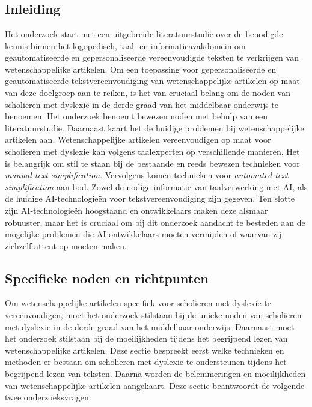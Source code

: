 \chapter{}%
\label{ch:stand-van-zaken}

\section{Inleiding}

Het onderzoek start met een uitgebreide literatuurstudie over de benodigde kennis binnen het logopedisch, taal- en informaticavakdomein om geautomatiseerde en gepersonaliseerde vereenvoudigde teksten te verkrijgen van wetenschappelijke artikelen. Om een toepassing voor gepersonaliseerde en geautomatiseerde tekstvereenvoudiging van wetenschappelijke artikelen  op maat van deze doelgroep aan te reiken, is het van cruciaal belang om de noden van scholieren met dyslexie in de derde graad van het middelbaar onderwijs te benoemen. Het onderzoek benoemt bewezen noden met behulp van een literatuurstudie. Daarnaast kaart het de huidige problemen bij wetenschappelijke artikelen aan. Wetenschappelijke artikelen vereenvoudigen op maat voor scholieren met dyslexie kan volgens taalexperten op verschillende manieren. Het is belangrijk om stil te staan bij de bestaande en reeds bewezen technieken voor \textit{manual text simplification}. Vervolgens komen technieken voor \textit{automated text simplification} aan bod. Zowel de nodige informatie van taalverwerking met AI, als de huidige AI-technologieën voor tekstvereenvoudiging zijn gegeven. Ten slotte zijn AI-technologieën hoogstaand en ontwikkelaars maken deze alsmaar robuuster, maar het is cruciaal om bij dit onderzoek aandacht te besteden aan de mogelijke problemen die AI-ontwikkelaars moeten vermijden of waarvan zij zichzelf attent op moeten maken. 

\section{Specifieke noden en richtpunten}

Om wetenschappelijke artikelen specifiek voor scholieren met dyslexie te vereenvoudigen, moet het onderzoek stilstaan bij de unieke noden van scholieren met dyslexie in de derde graad van het middelbaar onderwijs. Daarnaast moet het onderzoek stilstaan bij de moeilijkheden tijdens het begrijpend lezen van wetenschappelijke artikelen. Deze sectie bespreekt eerst welke technieken en methoden er bestaan om scholieren met dyslexie te ondersteunen tijdens het begrijpend lezen van teksten. Daarna worden de belemmeringen en moeilijkheden van wetenschappelijke artikelen aangekaart. Deze sectie beantwoordt de volgende twee onderzoeksvragen: 


